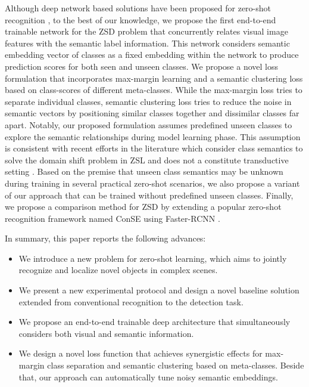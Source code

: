 \documentclass[runningheads]{llncs}
\begin{document}
Although deep network based solutions have been proposed for zero-shot recognition \cite{DeViSE_NIPS_2013,Ba_CVPR_2015,Zhang_2017_CVPR}, to the best of our knowledge, we propose the first end-to-end trainable network for the ZSD problem that concurrently relates visual image features with the semantic label information. This network considers semantic embedding vector of classes as a fixed embedding within the network to produce prediction scores for both seen and unseen classes. We propose a novel loss formulation that incorporates max-margin learning \cite{Zhang_2016_CVPR} and a semantic clustering loss based on class-scores of different meta-classes. While the max-margin loss tries to separate individual classes, semantic clustering loss tries to reduce the noise in semantic vectors by positioning similar classes together and dissimilar classes far apart. Notably, our proposed formulation assumes predefined unseen classes to explore the semantic relationships during model learning phase. This assumption is consistent with recent efforts in the literature which consider class semantics to solve the domain shift problem in ZSL \cite{Deng_ECCV_2014,Fu_PAMI_2017} and does not a constitute transductive setting \cite{Deutsch_2017_CVPR,Fu_Transductive_2015,Kodirov_2015_ICCV}. Based on the premise that unseen class semantics may be unknown during training in several practical zero-shot scenarios, we also propose a variant of our approach that can be trained without predefined unseen classes. 
Finally, we propose a comparison method for ZSD by extending a popular zero-shot recognition framework named ConSE \cite{norouzi_arXiv_2013} using Faster-RCNN \cite{Faster_RCNN_2017}. 


In summary, this paper reports the following advances:
\vspace{-0.4em}
\begin{itemize}\item We introduce a new problem for zero-shot learning, which aims to jointly recognize and localize novel objects in complex scenes. 
\item We present a new experimental protocol and design a novel baseline solution extended from conventional recognition to the detection task.
\item We propose an end-to-end trainable deep architecture that simultaneously considers both visual and semantic information.
\item We design a novel loss function that achieves synergistic effects for max-margin class separation and semantic clustering based on meta-classes. Beside that, our approach can automatically tune noisy semantic embeddings.
\end{itemize}
\end{document}
